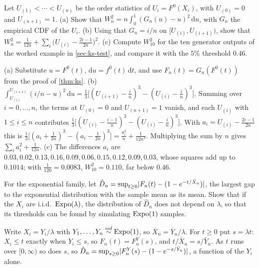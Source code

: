 \begin{exercise}
\label{ex:ks-cvm}
Let $U_{(1)} < \cdots < U_{(n)}$ be the order statistics of $U_i = F^0(X_i)$, with $U_{(0)} = 0$ and $U_{(n+1)} = 1$. (a) Show that $W^2_n = n\int_0^1(G_n(u) - u)^2\,\mathrm{d}u$, with $G_n$ the empirical CDF of the $U_i$. (b) Using that $G_n = i/n$ on $[U_{(i)}, U_{(i+1)})$, show that $W^2_n = \frac1{12n} + \sum_i\big(U_{(i)} - \frac{2i-1}{2n}\big)^2$. (c) Compute $W^2_{10}$ for the ten generator outputs of the worked example in \cref{sec:ks-test}, and compare it with the $5\%$ threshold $0.46$.
\end{exercise}
\begin{solution}
(a) Substitute $u = F^0(t)$, $\mathrm{d}u = f^0(t)\,\mathrm{d}t$, and use $F_n(t) = G_n(F^0(t))$ from the proof of \cref{thm:ks}. (b) $\int_{U_{(i)}}^{U_{(i+1)}}(i/n - u)^2\,\mathrm{d}u = \frac13\big[(U_{(i+1)} - \frac{i}{n})^3 - (U_{(i)} - \frac{i}{n})^3\big]$. Summing over $i = 0, \ldots, n$, the terms at $U_{(0)} = 0$ and $U_{(n+1)} = 1$ vanish, and each $U_{(i)}$ with $1 \leq i \leq n$ contributes $\frac13\big[(U_{(i)} - \frac{i-1}{n})^3 - (U_{(i)} - \frac{i}{n})^3\big]$. With $a_i = U_{(i)} - \frac{2i-1}{2n}$ this is $\frac13\big[(a_i + \frac1{2n})^3 - (a_i - \frac1{2n})^3\big] = \frac{a_i^2}{n} + \frac1{12n^3}$. Multiplying the sum by $n$ gives $\sum_ia_i^2 + \frac1{12n}$. (c) The differences $a_i$ are $0.03, 0.02, 0.13, 0.16, 0.09, 0.06, 0.15, 0.12, 0.09, 0.03$, whose squares add up to $0.1014$; with $\frac1{120} = 0.0083$, $W^2_{10} = 0.110$, far below $0.46$.
\end{solution}

\begin{exercise}
\label{ex:ks-expo}
For the exponential family, let $\hat{D}_n = \sup_{t \geq 0}\lvert F_n(t) - (1 - e^{-t/\bar{X}_n})\rvert$, the largest gap to the exponential distribution with the sample mean as its mean. Show that if the $X_i$ are i.i.d.\ $\text{Expo}(\lambda)$, the distribution of $\hat{D}_n$ does not depend on $\lambda$, so that its thresholds can be found by simulating $\text{Expo}(1)$ samples.
\end{exercise}
\begin{solution}
Write $X_i = Y_i/\lambda$ with $Y_1, \ldots, Y_n \stackrel{iid}{\sim} \text{Expo}(1)$, so $\bar{X}_n = \bar{Y}_n/\lambda$. For $t \geq 0$ put $s = \lambda t$: $X_i \leq t$ exactly when $Y_i \leq s$, so $F_n(t) = F^Y_n(s)$, and $t/\bar{X}_n = s/\bar{Y}_n$. As $t$ runs over $[0, \infty)$ so does $s$, so $\hat{D}_n = \sup_{s \geq 0}\lvert F^Y_n(s) - (1 - e^{-s/\bar{Y}_n})\rvert$, a function of the $Y_i$ alone.
\end{solution}

